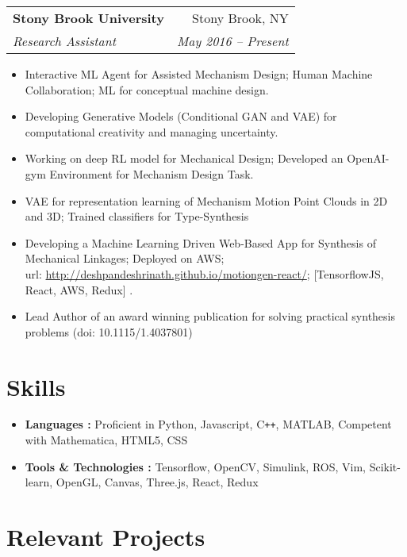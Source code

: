 \documentclass[letterpaper,10pt]{article}
\makeatletter
\newcommand{\resumeHeading}[4]{
  \vspace{-1pt}
    \begin{tabular*}{0.97\textwidth}{l@{\extracolsep{\fill}}r}
      \textbf{#1} & #2 \vspace{-2pt}\\ \vspace{1pt}
      \textit{\small#3} & \textit{\small #4} \\
    \end{tabular*}
}
\newcommand{\resumeSubheadingNew}[1]{
      {\small{#1}} \\
}
\newcommand{\resumeSection}[1]{
\vspace{-12pt}
\section{\textbf{#1}}
}
\newcommand{\resumeItemListStart}{
\vspace{-7pt}
\begin{itemize}[leftmargin=14pt]
}
\newcommand{\resumeItemListEnd}{
\vspace{+7pt}
\end{itemize}
}
\newcommand{\resumeItem}[1]{
  \item\small{
      {#1 \vspace{-7pt}
      }
  }
}
\makeatother
\begin{document}
    \resumeHeading
      {Stony Brook University}{Stony Brook, NY}
      {Research Assistant}{May 2016 -- Present}
      \resumeItemListStart
        \resumeItem{Interactive ML Agent for Assisted Mechanism Design; Human Machine Collaboration; ML for conceptual machine design.}
        \resumeItem{Developing Generative Models (Conditional GAN and VAE) for computational creativity and managing uncertainty.}
        \resumeItem{Working on deep RL model for Mechanical Design; Developed an OpenAI-gym Environment for Mechanism Design Task.}
        \resumeItem{VAE for representation learning of Mechanism Motion Point Clouds in 2D and 3D; Trained classifiers for Type-Synthesis}
        \resumeItem{Developing a Machine Learning Driven Web-Based App for Synthesis of Mechanical Linkages; Deployed on AWS;  \\ url: \href{http://deshpandeshrinath.github.io/motiongen-react/}{http://deshpandeshrinath.github.io/motiongen-react/}; [TensorflowJS, React, AWS, Redux]}.
        \resumeItem{Lead Author of an award winning publication for solving practical synthesis problems (doi: 10.1115/1.4037801)}
      \resumeItemListEnd


\resumeSection{Skills}
\vspace{+7pt}
    \resumeItemListStart
      \resumeItem{\textbf{Languages :} Proficient in Python, Javascript, C\texttt{++}, MATLAB, Competent with Mathematica, HTML5, CSS}
      \resumeItem{\textbf{Tools \& Technologies :} Tensorflow, OpenCV, Simulink, ROS, Vim, Scikit-learn, OpenGL, Canvas, Three.js, React, Redux}
    \resumeItemListEnd


    \resumeSection{Relevant Projects}
\end{document}
